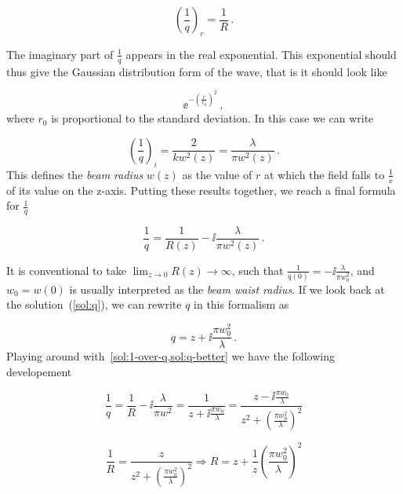 \documentclass[12pt, class=report, crop=false]{standalone}
\begin{document}
\begin{equation}
  \left( \frac{1}{q} \right)_r = \frac{1}{R}\,.
\end{equation}

The imaginary part of \(\frac{1}{q}\) appears in the real exponential. This exponential should thus give the Gaussian distribution form of the wave, that is it should look like

\begin{equation}
  \ee^{-\left( \frac{r}{r_0} \right)^2}\,,
\end{equation}
where \(r_0\) is proportional to the standard deviation. In this case we can write

\begin{equation}
  \left(\frac{1}{q}\right)_i = \frac{2}{k w^2 (z)} = \frac{\lambda}{\pi w^2 (z)}\,.
\end{equation}
This defines the \textit{beam radius} \(w(z)\) as the value of \(r\) at which the field falls to \(\frac{1}{\ee}\) of its value on the z-axis. Putting these results together, we reach a final formula for \(\frac{1}{q}\)

\begin{equation}
  \label{sol:1-over-q}
  \frac{1}{q} = \frac{1}{R(z)} - \ii \frac{\lambda}{\pi w^2 (z)}\,.
\end{equation}

It is conventional to take \(\lim_{z\to0} R(z) \rightarrow \infty\), such that \(\frac{1}{q(0)} = -\ii \frac{\lambda}{\pi w_0^2}\), and \(w_0=w(0)\) is usually interpreted as the \textit{beam waist radius}. If we look back at the solution~(\ref{sol:q}), we can rewrite \(q\) in this formalism as

\begin{equation}
  \label{sol:q-better}
  q = z + \ii \frac{\pi w_0^2}{\lambda}\,.
\end{equation}
Playing around with~\cref{sol:1-over-q,sol:q-better} we have the following developement

\begin{equation*}
  \frac{1}{q} = \frac{1}{R} - \ii \frac{\lambda}{\pi w^2} = \frac{1}{z+ \ii \frac{\pi w_0}{\lambda}} = \frac{z - \ii \frac{\pi w_0}{\lambda}}{z^2 + \left(\frac{\pi w_0^2}{\lambda} \right)^2}
\end{equation*}

\begin{equation*}
  \frac{1}{R} = \frac{z}{z^2 + \left(\frac{\pi w_0^2}{\lambda} \right)^2} \Rightarrow R = z + \frac{1}{z} \left(\frac{\pi w_0^2}{\lambda} \right)^2
\end{equation*}
\end{document}
